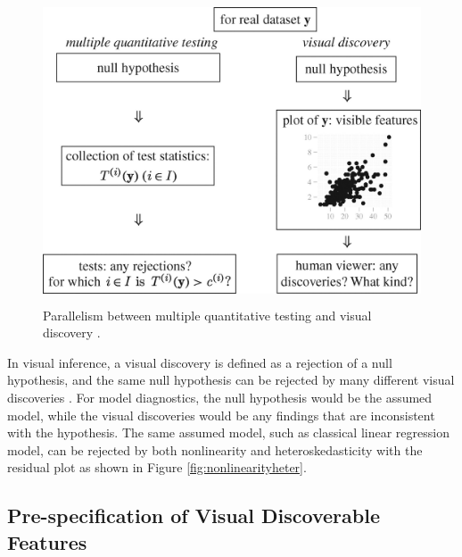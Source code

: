\documentclass{monashthesis}
\begin{document}
\begin{figure}
\centering
\includegraphics[width=4.6875in,height=3.55208in]{figures/rsta2009012001.jpg}
\caption{Parallelism between multiple quantitative testing and visual discovery \autocite{buja_statistical_2009}. \label{fig:parallelism}}
\end{figure}



In visual inference, a visual discovery is defined as a rejection of a null hypothesis, and the same null hypothesis can be rejected by many different visual discoveries \autocite{buja_statistical_2009}. For model diagnostics, the null hypothesis would be the assumed model, while the visual discoveries would be any findings that are inconsistent with the hypothesis. The same assumed model, such as classical linear regression model, can be rejected by both nonlinearity and heteroskedasticity with the residual plot as shown in Figure \ref{fig:nonlinearityheter}.

\hypertarget{pre-specification-of-visual-discoverable-features}{%
\subsection{Pre-specification of Visual Discoverable Features}\label{pre-specification-of-visual-discoverable-features}}
\end{document}
